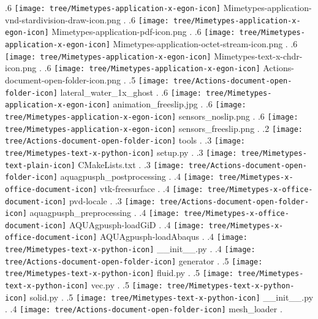 {.6 { \texttt{[image: tree/Mimetypes-application-x-egon-icon]} Mimetypes-application-vnd-stardivision-draw-icon.png }.
.6 { \texttt{[image: tree/Mimetypes-application-x-egon-icon]} Mimetypes-application-pdf-icon.png }.
.6 { \texttt{[image: tree/Mimetypes-application-x-egon-icon]} Mimetypes-application-octet-stream-icon.png }.
.6 { \texttt{[image: tree/Mimetypes-application-x-egon-icon]} Mimetypes-text-x-chdr-icon.png }.
.6 { \texttt{[image: tree/Mimetypes-application-x-egon-icon]} Actions-document-open-folder-icon.png }.
.5 { \texttt{[image: tree/Actions-document-open-folder-icon]} lateral\_water\_1x\_ghost }.
.6 { \texttt{[image: tree/Mimetypes-application-x-egon-icon]} animation\_freeslip.jpg }.
.6 { \texttt{[image: tree/Mimetypes-application-x-egon-icon]} sensors\_noslip.png }.
.6 { \texttt{[image: tree/Mimetypes-application-x-egon-icon]} sensors\_freeslip.png }.
.2 { \texttt{[image: tree/Actions-document-open-folder-icon]} tools }.
.3 { \texttt{[image: tree/Mimetypes-text-x-python-icon]} setup.py }.
.3 { \texttt{[image: tree/Mimetypes-text-plain-icon]} CMakeLists.txt }.
.3 { \texttt{[image: tree/Actions-document-open-folder-icon]} aquagpusph\_postprocessing }.
.4 { \texttt{[image: tree/Mimetypes-x-office-document-icon]} vtk-freesurface }.
.4 { \texttt{[image: tree/Mimetypes-x-office-document-icon]} pvd-locale }.
.3 { \texttt{[image: tree/Actions-document-open-folder-icon]} aquagpusph\_preprocessing }.
.4 { \texttt{[image: tree/Mimetypes-x-office-document-icon]} AQUAgpusph-loadGiD }.
.4 { \texttt{[image: tree/Mimetypes-x-office-document-icon]} AQUAgpusph-loadAbaqus }.
.4 { \texttt{[image: tree/Mimetypes-text-x-python-icon]} \_\_init\_\_.py }.
.4 { \texttt{[image: tree/Actions-document-open-folder-icon]} generator }.
.5 { \texttt{[image: tree/Mimetypes-text-x-python-icon]} fluid.py }.
.5 { \texttt{[image: tree/Mimetypes-text-x-python-icon]} vec.py }.
.5 { \texttt{[image: tree/Mimetypes-text-x-python-icon]} solid.py }.
.5 { \texttt{[image: tree/Mimetypes-text-x-python-icon]} \_\_init\_\_.py }.
.4 { \texttt{[image: tree/Actions-document-open-folder-icon]} mesh\_loader }.
}
